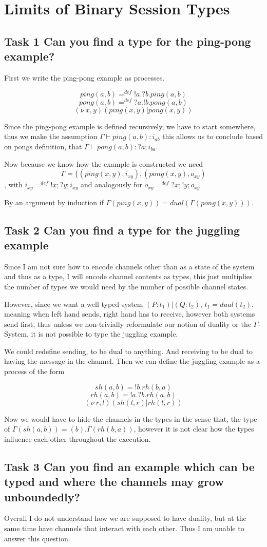 \section{Limits of Binary Session Types}

\subsection{Task 1 Can you find a type for the ping-pong example?}

First we write the ping-pong example as processes.

\[ping(a,b) =^{def} !a.?b.ping(a,b)\]
\[pong(a,b) =^{def} ?a.!b.pong(a,b)\]
\[(\nu~x,y)(ping(x,y)|pong(x,y))\]

Since the ping-pong example is defined recursively, we have to start somewhere, thus we make the assumption $\Gamma \vdash ping(a,b):i_{ab}$ this allows us to conclude based on pongs definition, that $\Gamma \vdash pong(a,b):?a;i_{ba}$.

Now because we know how the example is constructed we need \[\Gamma = \{(ping(x,y),i_{xy}),(pong(x,y),o_{xy})\], with $i_{xy}=^{def}!x;?y;i_{xy}$ and analogously for $o_{xy}=^{def}?x;!y;o_{xy}$

By an argument by induction if $\Gamma(ping(x,y))=dual(\Gamma(pong(x,y)))$.

\subsection{Task 2 Can you find a type for the juggling example}

Since I am not sure how to encode channels other than as a state of the system and thus as a type, I will encode channel contents as types, this just multiplies the number of types we would need by the number of possible channel states.

However, since we want a well typed system $(P:t_1)|(Q:t_2)$, $t_1=dual(t_2)$, meaning when left hand sends, right hand has to receive, however both systems send first, thus unless we non-trivially reformulate our notion of duality or the $\Gamma$-System, it is not possible to type the juggling example.

We could redefine sending, to be dual to anything. And receiving to be dual to having the message in the channel. Then we can define the juggling example as a process of the form

\[sh(a,b)=!b.rh(b,a)\]
\[rh(a,b)=!a.?b.rh(a,b)\]
\[(\nu~r,l)(sh(l,r)|rh(l,r))\]

Now we would have to hide the channels in the types in the sense that, the type of $\Gamma(sh(a,b))=(b).\Gamma(rh(b,a))$, however it is not clear how the types influence each other throughout the execution.

\subsection{Task 3 Can you find an example which can be typed and where the channels may grow unboundedly?}

Overall I do not understand how we are supposed to have duality, but at the same time have channels that interact with each other. Thus I am unable to answer this question.